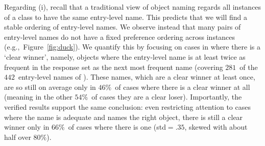 Regarding (i), recall that a traditional view of object naming regards all instances of a class to have the same entry-level name.
This predicts that we will find a stable ordering of entry-level names. 
We observe instead that many pairs of entry-level names do not have a fixed preference ordering across instances (e.g.,~Figure~\ref{fig:duck}). 
We quantify this by focusing on cases in \mn where there is a `clear winner', namely, objects where the entry-level name is at least twice as frequent in the response set as the next most frequent name (covering $281$~of the $442$~entry-level names of \mn).
These names, which are a clear winner at least once, are so still on average only in $46\%$~of cases where there is a clear winner at all (meaning in the other $54\%$~of cases they are a clear loser).
Importantly, the verified results support the same conclusion: 
even restricting attention to cases where the name is adequate and names the right object, there is still a clear winner only in $66\%$~of cases where there is one (std\mbox{$=.35$}, skewed with about half over $80\%$).


